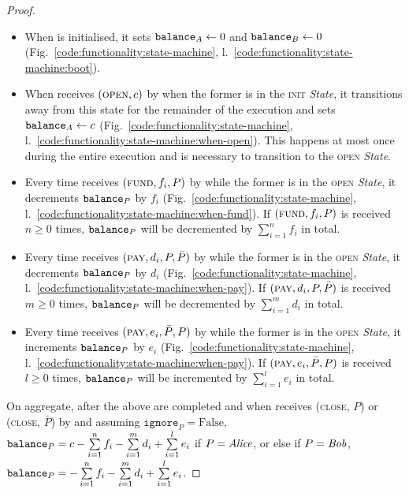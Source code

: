 \begin{proof}
  \ \\
  \begin{itemize}
    \item When \fchan is initialised, it sets $\texttt{balance}_{A} \gets 0$ and
    $\texttt{balance}_{B} \gets 0$ (Fig.~\ref{code:functionality:state-machine},
    l.~\ref{code:functionality:state-machine:boot}).
    \item When \fchan receives $(\textsc{open}, c)$ by \simulator when the
    former is in the \textsc{init} \textit{State}, it transitions away from this
    state for the remainder of the execution and sets $\texttt{balance}_{A} \gets c$
    (Fig.~\ref{code:functionality:state-machine},
    l.~\ref{code:functionality:state-machine:when-open}). This happens at most
    once during the entire execution and is necessary to transition to the
    \textsc{open} \textit{State}.
    \item Every time \fchan receives $(\textsc{fund}, f_i, P)$ by \simulator
    while the former is in the \textsc{open} \textit{State}, it decrements
    $\texttt{balance}_{P}$ by $f_i$ (Fig.~\ref{code:functionality:state-machine},
    l.~\ref{code:functionality:state-machine:when-fund}). If $(\textsc{fund},
    f_i, P)$ is received $n \geq 0$ times, $\texttt{balance}_{P}$ will be decremented by
    $\sum\limits_{i=1}^n f_i$ in total.
    \item Every time \fchan receives $(\textsc{pay}, d_i, P, \bar{P})$ by
    \simulator while the former is in the \textsc{open} \textit{State}, it
    decrements $\texttt{balance}_{P}$ by $d_i$
    (Fig.~\ref{code:functionality:state-machine},
    l.~\ref{code:functionality:state-machine:when-pay}). If $(\textsc{pay}, d_i,
    P, \bar{P})$ is received $m \geq 0$ times, $\texttt{balance}_{P}$ will be decremented
    by $\sum\limits_{i=1}^m d_i$ in total.
    \item Every time \fchan receives $(\textsc{pay}, e_i, \bar{P}, P)$ by
    \simulator while the former is in the \textsc{open} \textit{State}, it
    increments $\texttt{balance}_{P}$ by $e_i$
    (Fig.~\ref{code:functionality:state-machine},
    l.~\ref{code:functionality:state-machine:when-pay}). If $(\textsc{pay}, e_i,
    \bar{P}, P)$ is received $l \geq 0$ times, $\texttt{balance}_{P}$ will be incremented
    by $\sum\limits_{i=1}^l e_i$ in total.
  \end{itemize}
  On aggregate, after the above are completed and when \fchan receives
  (\textsc{close}, $P$) or (\textsc{close}, $\bar{P}$) by \simulator and
  assuming $\texttt{ignore}_P = \mathrm{False}$, $\texttt{balance}_{P} = c -
  \sum\limits_{i=1}^n f_i - \sum\limits_{i=1}^m d_i + \sum\limits_{i=1}^l e_i$
  if $P = \mathit{Alice}$, or else if $P = \mathit{Bob}$, $\texttt{balance}_{P} = - \sum\limits_{i=1}^n
  f_i - \sum\limits_{i=1}^m d_i + \sum\limits_{i=1}^l e_i$.
\end{proof}
